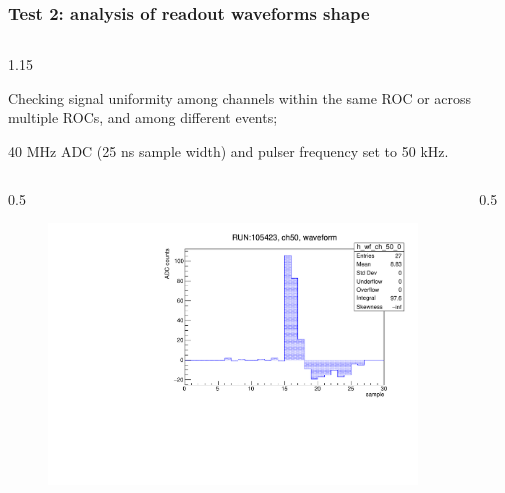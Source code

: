 \documentclass{beamer}
\begin{document}
\begin{frame}
    \frametitle{Test 2: analysis of readout waveforms shape}
    \vspace{-4mm}
    \begin{columns}
\begin{column}{1.15\framewidth}
    \setlength{\leftmargini}{1.2em}
 \begin{itemize}
 {\footnotesize
  \item Checking signal uniformity among channels within the same ROC or across multiple ROCs, and among different events;
  \item 40 MHz ADC (25 ns sample width) and pulser frequency set to 50 kHz.}
  \end{itemize}
    \end{column}
    \end{columns}
    \vspace{0mm}
    \begin{columns}
\begin{column}{0.5\framewidth}
         \begin{figure}[!h]
      \centering
      \hspace*{-2em}
      \includegraphics[width=1.\columnwidth]{figures/pdf/wf_ch50_0.pdf}
     \label{fig:normalhits}
\end{figure}
\end{column}
\begin{column}{0.5\framewidth}
      \begin{figure}[!h]
      \centering
            \hspace*{-1em}

\end{figure}
\end{column}
\end{columns}
\end{frame}
\end{document}
